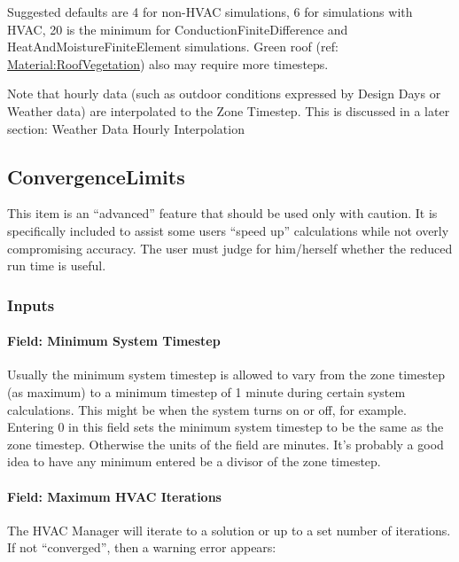 Suggested defaults are 4 for non-HVAC simulations, 6 for simulations with HVAC, 20 is the minimum for ConductionFiniteDifference and HeatAndMoistureFiniteElement simulations. Green roof (ref: \hyperref[materialroofvegetation]{Material:RoofVegetation}) also may require more timesteps.

Note that hourly data (such as outdoor conditions expressed by Design Days or Weather data) are interpolated to the Zone Timestep. This is discussed in a later section: Weather Data Hourly Interpolation

\subsection{ConvergenceLimits}\label{convergencelimits}

This item is an ``advanced'' feature that should be used only with caution. It is specifically included to assist some users ``speed up'' calculations while not overly compromising accuracy. The user must judge for him/herself whether the reduced run time is useful.

\subsubsection{Inputs}\label{inputs-2-038}

\paragraph{Field: Minimum System Timestep}\label{field-minimum-system-timestep}

Usually the minimum system timestep is allowed to vary from the zone timestep (as maximum) to a minimum timestep of 1 minute during certain system calculations. This might be when the system turns on or off, for example. Entering 0 in this field sets the minimum system timestep to be the same as the zone timestep. Otherwise the units of the field are minutes. It's probably a good idea to have any minimum entered be a divisor of the zone timestep.

\paragraph{Field: Maximum HVAC Iterations}\label{field-maximum-hvac-iterations}

The HVAC Manager will iterate to a solution or up to a set number of iterations. If not ``converged'', then a warning error appears:

